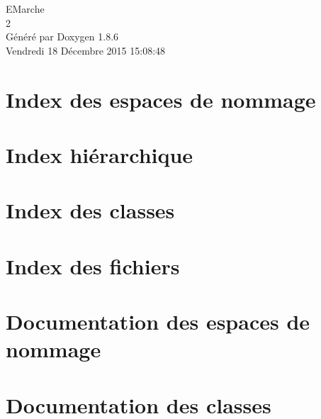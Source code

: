 \documentclass[twoside]{book}
\newcommand{\clearemptydoublepage}{%
  \newpage{\pagestyle{empty}\cleardoublepage}%
}
\begin{document}
\hypersetup{pageanchor=false}
\begin{titlepage}
\vspace*{7cm}
\begin{center}%
{\Large E\-Marche \\[1ex]\large 2 }\\
\vspace*{1cm}
{\large Généré par Doxygen 1.8.6}\\
\vspace*{0.5cm}
{\small Vendredi 18 Décembre 2015 15:08:48}\\
\end{center}
\end{titlepage}
\clearemptydoublepage
\tableofcontents
\clearemptydoublepage
{}
\hypersetup{pageanchor=true}

\chapter{Index des espaces de nommage}

\chapter{Index hiérarchique}

\chapter{Index des classes}

\chapter{Index des fichiers}

\chapter{Documentation des espaces de nommage}

\chapter{Documentation des classes}


























\end{document}
